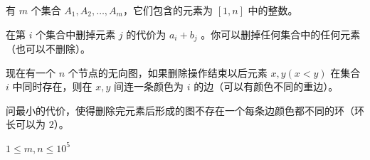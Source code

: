 有 $m$ 个集合 $A_1,A_2,\dots,A_m$，它们包含的元素为 $[1,n]$ 中的整数。

在第 $i$ 个集合中删掉元素 $j$ 的代价为 $a_i+b_j$ 。你可以删掉任何集合中的任何元素（也可以不删除）。

现在有一个 $n$ 个节点的无向图，如果删除操作结束以后元素 $x,y(x<y)$ 在集合 $i$ 中同时存在，则在 $x,y$ 间连一条颜色为 $i$ 的边（可以有颜色不同的重边）。

问最小的代价，使得删除完元素后形成的图不存在一个每条边颜色都不同的环（环长可以为 $2$）。

$ 1 \leq m, n \leq 10^5 $ 
